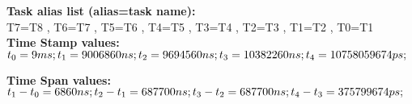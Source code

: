 \documentclass[landscape,a4paper,10pt]{article}
\begin{document}
\textbf{Task alias list (alias=task name):}\\
T7=T8 , 
T6=T7 , 
T5=T6 , 
T4=T5 , 
T3=T4 , 
T2=T3 , 
T1=T2 , 
T0=T1\\

\textbf{Time Stamp values:}\\
$t_{0} = 9 ms; t_{1} = 9006860 ns; t_{2} = 9694560 ns; t_{3} = 10382260 ns; t_{4} = 10758059674 ps;  \\
$

\textbf{Time Span values:}\\
$t_{1} - t_{0} = 6860 ns; t_{2} - t_{1} = 687700 ns; t_{3} - t_{2} = 687700 ns; t_{4} - t_{3} = 375799674 ps;  \\
$
\end{document}
